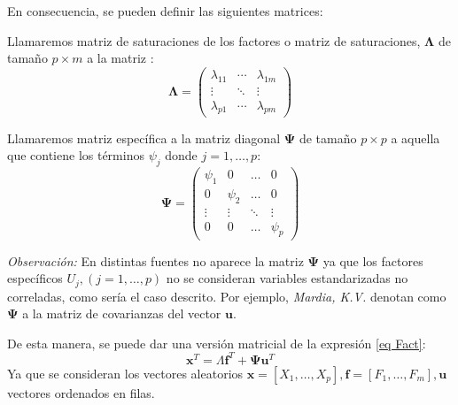 \noindent En consecuencia, se pueden definir las siguientes matrices: 

\begin{defi}
Llamaremos matriz de saturaciones de los factores o matriz de saturaciones, $\mathbf{\Lambda}$ de tamaño $p \times m$ a la matriz :
\begin{equation}
\mathbf{\Lambda}=\begin{pmatrix}
\lambda_{11} & \cdots & \lambda_{1 m}\\
\vdots & \ddots & \vdots\\
\lambda_{p1} & \cdots & \lambda_{pm}
\end{pmatrix}
\end{equation}
\end{defi}

\begin{defi}
Llamaremos matriz específica a la matriz diagonal $\mathbf{\Psi}$ de tamaño $p\times p$ a aquella que contiene los términos $\psi_j$ donde $j=1,\ldots , p$:
\begin{equation}
\mathbf{\Psi}=\begin{pmatrix}
    \psi_1 & 0 & \dots & 0 \\
    0 & \psi_2 & \dots & 0 \\
    \vdots & \vdots & \ddots & \vdots \\
    0 & 0 & \dots & \psi_p
\end{pmatrix}
\end{equation}
\end{defi}

\noindent \emph{Observación:} En distintas fuentes no aparece la matriz $\mathbf{\Psi}$ ya que los factores específicos $U_j, (j=1,\ldots,p)$ no se consideran variables estandarizadas no correladas, como sería el caso descrito. Por ejemplo,  \emph{Mardia, K.V.} \cite{Mardia 1979} denotan como $\mathbf{\Psi}$ a la matriz de covarianzas del vector $\mathbf{u}$.

\noindent De esta manera, se puede dar una versión matricial de la expresión \ref{eq Fact}:
\begin{equation}
\mathbf{x}^T=\Lambda \mathbf{f}^T+ \mathbf{\Psi}\mathbf{u}^T
\end{equation}
Ya que se consideran los vectores aleatorios $\mathbf{x}=[X_1,\ldots,X_p], \mathbf{f}=[F_1,\ldots,F_m], \mathbf{u}$ vectores ordenados en filas. 

